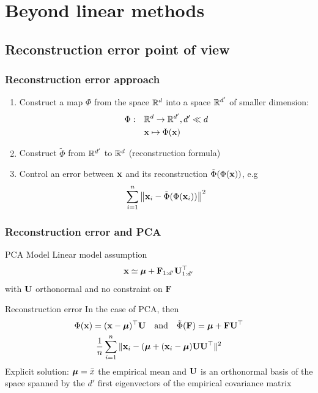 \documentclass{beamer}\usepackage[]{graphicx}\usepackage[]{color}
\begin{document}
\section{Beyond linear methods}

\subsection{Reconstruction error point of view}

\begin{frame}
  \frametitle{Reconstruction error approach}

  \begin{enumerate}
    \item  Construct a map $\Phi$ from the space $\mathbb{R}^{d}$ into a space $\mathbb{R}^{d'}$ of \alert{smaller dimension}:
      \begin{align*}
      \Phi:\quad & \mathbb{R}^d \to \mathbb{R}^{d'}, d' \ll d\\
               & \mathbf{x} \mapsto \Phi(\mathbf{x})
      \end{align*}
    \item Construct $\widetilde{\Phi}$ from $\mathbb{R}^{d'}$ to $\mathbb{R}^d$ (\alert{reconstruction formula})
     \item Control an error between $\mathbf{x}$ and its reconstruction $\tilde{\Phi}(\Phi(\mathbf{x}))$, e.g
      \begin{equation*}
        \sum_{i=1}^n \left\| \mathbf{x}_i - \tilde{\Phi}(\Phi(\mathbf{x}_i)) \right\|^2
      \end{equation*}
  \end{enumerate}

\end{frame}


\begin{frame}
\frametitle{Reconstruction error and PCA}

  \begin{block}{PCA Model}
    Linear model assumption
    \begin{equation*}
        \mathbf{x} \simeq \boldsymbol{\mu} + \mathbf{F}_{1:d'} \mathbf{U}_{1:d'}^\top
      \end{equation*}
      with $\mathbf{U}$ orthonormal and no  constraint on $\mathbf{F}$
    \end{block}
    
  \begin{block}{Reconstruction error}
    In the case of PCA, then
    \begin{gather*}
      \Phi(\mathbf{x}) = (\mathbf{x}-\boldsymbol{\mu})^\top \mathbf{U}  \quad \text{and} \quad \tilde{\Phi}(\mathbf{F})= \boldsymbol{\mu} + \mathbf{F} \mathbf{U}^\top  \\
      \frac{1}{n} \sum_{i=1}^n \| \mathbf{x}_i  - ( \boldsymbol{\mu} + ( \mathbf{x}_i -\boldsymbol{\mu}) \mathbf{U} \mathbf{U}^\top \|^2
    \end{gather*}
  \alert{Explicit solution:} $\boldsymbol{\mu} = \bar{x}$ the empirical mean
 and $\mathbf{U}$ is an orthonormal basis of the space spanned by the $d'$
 first eigenvectors of the empirical covariance matrix
  \end{block}
\end{frame}
\end{document}
